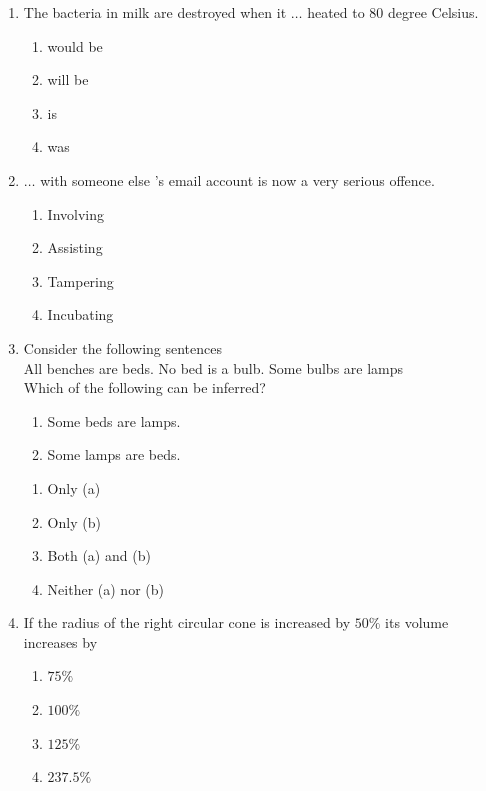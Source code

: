 \documentclass[journal]{IEEEtran}
\begin{document}
\begin{enumerate}[start=53]
    \item The bacteria in milk are destroyed when it $\dots$ heated to $80$ degree Celsius.
    \begin{multicols}{4}
        \begin{enumerate}
            \item would be
            \item will be
            \item is
            \item was
        \end{enumerate}
    \end{multicols}

    \item $\dots$ with someone else 's email account is now a very serious offence.
    \begin{multicols}{4}
        \begin{enumerate}
            \item Involving
            \item Assisting
            \item Tampering
            \item Incubating
        \end{enumerate}
    \end{multicols}

    \item Consider the following sentences\\
    All benches are beds. No bed is a bulb. Some bulbs are lamps \\
    Which of the following can be inferred?
    \begin{enumerate}
    \item Some beds are lamps.
    \item Some lamps are beds.
    \end{enumerate}

    \begin{multicols}{2}
        \begin{enumerate}
            \item Only (a)
            \item Only (b)
            \item Both (a) and (b)
            \item Neither (a) nor (b)
        \end{enumerate}
    \end{multicols}


    \item If the radius of the right circular cone is increased by $50 \%$ its volume increases by
    \begin{multicols}{4}
        \begin{enumerate}
            \item $75 \%$
            \item $100 \%$
            \item $125 \%$
            \item $237.5 \%$
        \end{enumerate}
    \end{multicols}


\end{enumerate}
\end{document}

